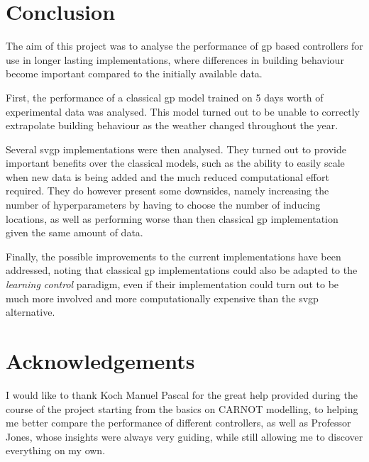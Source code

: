\section{Conclusion}

The aim of this project was to analyse the performance of \acrshort{gp} based
controllers for use in longer lasting implementations, where differences in
building behaviour become important compared to the initially available data.

First, the performance of a classical \acrshort{gp} model trained on 5 days
worth of experimental data was analysed. This model turned out to be unable to
correctly extrapolate building behaviour as the weather changed throughout the
year.

Several \acrshort{svgp} implementations were then analysed. They turned out to
provide important benefits over the classical models, such as the ability to
easily scale when new data is being added and the much reduced computational
effort required. They do however present some downsides, namely increasing the
number of hyperparameters by having to choose the number of inducing locations,
as well as performing worse than then classical \acrshort{gp} implementation
given the same amount of data.

Finally, the possible improvements to the current implementations have been
addressed, noting that classical \acrshort{gp} implementations could also be
adapted to the \textit{learning control} paradigm, even if their implementation
could turn out to be much more involved and more computationally expensive than
the \acrshort{svgp} alternative.

\section*{Acknowledgements}

I would like to thank Koch Manuel Pascal for the great help provided during the
course of the project starting from the basics on CARNOT modelling, to helping
me better compare the performance of different controllers, as well as Professor
Jones, whose insights were always very guiding, while still allowing me to
discover everything on my own.

\clearpage
